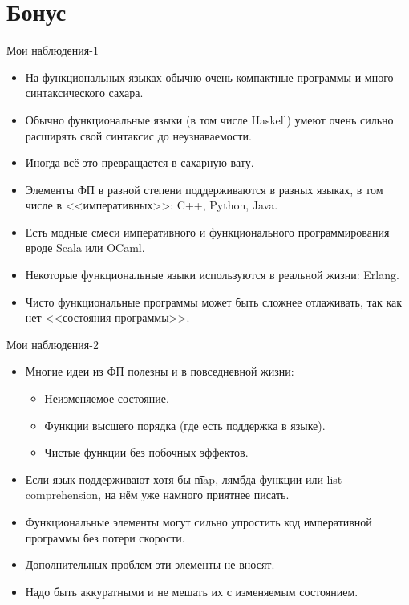 \section{Бонус}

\begin{frame}
\end{frame}

\begin{frame}{Мои наблюдения-1}
	\begin{itemize}
		\item На функциональных языках обычно очень компактные программы и много синтаксического сахара.
		\item Обычно функциональные языки (в том числе Haskell) умеют очень сильно расширять свой синтаксис до неузнаваемости.
		\item Иногда всё это превращается в сахарную вату.
		\item Элементы ФП в разной степени поддерживаются в разных языках, в том числе в
			<<императивных>>: C++, Python, Java.
		\item Есть модные смеси императивного и функционального программирования вроде Scala или OCaml.
		\item Некоторые функциональные языки используются в реальной жизни: Erlang.
		\item Чисто функциональные программы может быть сложнее отлаживать, так как нет <<состояния программы>>.
	\end{itemize}
\end{frame}

\begin{frame}{Мои наблюдения-2}
	\begin{itemize}
		\item Многие идеи из ФП полезны и в повседневной жизни:
			\begin{itemize}
				\item Неизменяемое состояние.
				\item Функции высшего порядка (где есть поддержка в языке).
				\item Чистые функции без побочных эффектов.
			\end{itemize}
		\item Если язык поддерживают хотя бы \t{map}, лямбда-функции или list comprehension,
			на нём уже намного приятнее писать.
		\item Функциональные элементы могут сильно упростить код императивной программы без потери скорости.
		\item Дополнительных проблем эти элементы не вносят.
		\item Надо быть аккуратными и не мешать их с изменяемым состоянием.
	\end{itemize}
\end{frame}
	
